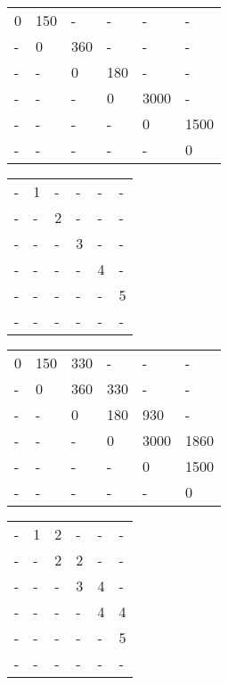 \documentclass[11pt]{article}
\begin{document}
\begin{sol}
\begin{table*}[htbp]
	\centering
	\begin{tabular}{|l|l|l|l|l|l|}
		 \hline
        0 & 150 & - & - & - & - \\ 
        - & 0 & 360 & - & - & - \\ 
        - & - & 0 & 180 & - & - \\ 
        - & - & - & 0 & 3000 & -\\ 
        - & - & - & - & 0 & 1500  \\ 
        - & - & - & - & - & 0 \\
        \hline
	\end{tabular}
	\hspace{20mm}
	\begin{tabular}{|l|l|l|l|l|l|}
		 \hline
        - & 1 & - & - & - & - \\ 
        - & - & 2 & - & - & - \\ 
        - & - & - & 3 & - & - \\ 
        - & - & - & - & 4 & - \\ 
        - & - & - & - & - & 5 \\ 
        - & - & - & - & - & - \\
        \hline
	\end{tabular}
	\caption{$m$ and $c$ tables for $l = 2$}
\end{table*}

\begin{table*}[htbp]
	\centering
	\begin{tabular}{|l|l|l|l|l|l|}
		 \hline
        0 & 150 & 330 & - & - & - \\ 
        - & 0 & 360 &330 & - & - \\ 
        - & - & 0 & 180 & 930 & - \\ 
        - & - & - & 0 & 3000 & 1860\\ 
        - & - & - & - & 0 & 1500  \\ 
        - & - & - & - & - & 0 \\
        \hline
	\end{tabular}
	\hspace{20mm}
	\begin{tabular}{|l|l|l|l|l|l|}
		 \hline
        - & 1 & 2 & - & - & - \\ 
        - & - & 2 & 2 & - & - \\ 
        - & - & - & 3 & 4 & - \\ 
        - & - & - & - & 4 & 4 \\ 
        - & - & - & - & - & 5 \\ 
        - & - & - & - & - & - \\
        \hline
	\end{tabular}
	\caption{$m$ and $c$ tables for $l = 3$}
\end{table*}


\end{sol}
\end{document}
